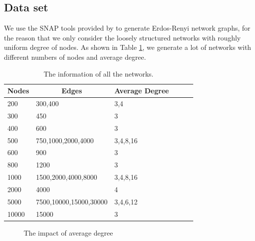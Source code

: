 \subsection{Data set}

We use the SNAP tools provided by \cite{snap} to generate Erdos-Renyi network graphs, for the reason that we only consider the loosely structured networks with roughly uniform degree of nodes. As shown in Table \ref{tab:t1}, we generate a lot of networks with different numbers of nodes and average degree. 
\begin{table}[h]
	\centering
	\begin{tabular}{|l|l|l|l|l|l|}
		\hline
		Nodes & \multicolumn{1}{c|}{Edges} & Average Degree \\ \hline
		200   & 300,400                    & 3,4            \\ \hline
		300   & 450                        & 3              \\ \hline
		400   & 600                        & 3              \\ \hline
		500   & 750,1000,2000,4000         & 3,4,8,16       \\ \hline
		600   & 900                        & 3              \\ \hline
		800   & 1200                       & 3              \\ \hline
		1000  & 1500,2000,4000,8000        & 3,4,8,16       \\ \hline
		2000  & 4000                       & 4              \\ \hline
		5000  & 7500,10000,15000,30000     & 3,4,6,12       \\ \hline
		10000 & 15000                      & 3              \\ \hline
	\end{tabular}
	\caption{The information of all the networks.}
	\label{tab:t1}
\end{table}
\begin{figure}[!htb]
	\caption{The impact of average degree}
\end{figure}

